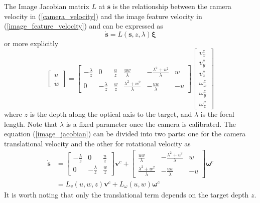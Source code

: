 The Image Jacobian matrix $L$ at $\mathbf{s}$ is the relationship between the camera velocity in (\ref{camera_velocity}) and the image feature velocity in (\ref{image_feature_velocity}) and can be expressed as 
\begin{equation}
\mathbf{\dot{s}}=L(\mathbf{s},z,\lambda)\mathbf{\xi}
\end{equation}
or more explicitly
\begin{equation}
\begin{bmatrix}
\dot{u} \\ \dot{w}
\end{bmatrix}
=\begin{bmatrix}
-\frac{\lambda}{z} & 0 & \frac{u}{z} & \frac{uw}{\lambda} & -\frac{\lambda^2+u^2}{\lambda} & w \\
0 & -\frac{\lambda}{z} & \frac{w}{z} & \frac{\lambda^2+w^2}{\lambda} & -\frac{uw}{\lambda} & -u
\end{bmatrix}
\begin{bmatrix}
v_x^c \\ v_y^c \\ v_z^c \\
\omega_x^c \\ \omega_y^c \\ \omega_z^c
\end{bmatrix}
\label{image_jacobian}
\end{equation}
where $z$ is the depth along the optical axis to the target, and $\lambda$ is the focal length. Note that $\lambda$ is a fixed parameter once the camera is calibrated. The equation (\ref{image_jacobian}) can be divided into two parts: one for the camera translational velocity and the other for rotational velocity as
\begin{align}
\mathbf{\dot{s}}&=\begin{bmatrix}
-\frac{\lambda}{z} & 0 & \frac{u}{z} \\
0 & -\frac{\lambda}{z} & \frac{w}{z}
\end{bmatrix}\mathbf{v}^c+
\begin{bmatrix}
\frac{uw}{\lambda} & -\frac{\lambda^2+u^2}{\lambda} & w \\
\frac{\lambda^2+w^2}{\lambda} & -\frac{uw}{\lambda} & -u
\end{bmatrix}\mathbf{\omega}^c
\\&=L_v(u,w,z)\mathbf{v}^c+L_{\omega}(u,w)\mathbf{\omega}^c
\label{image_jacobian1}
\end{align}
It is worth noting that only the translational term depends on the target depth $z$. 


